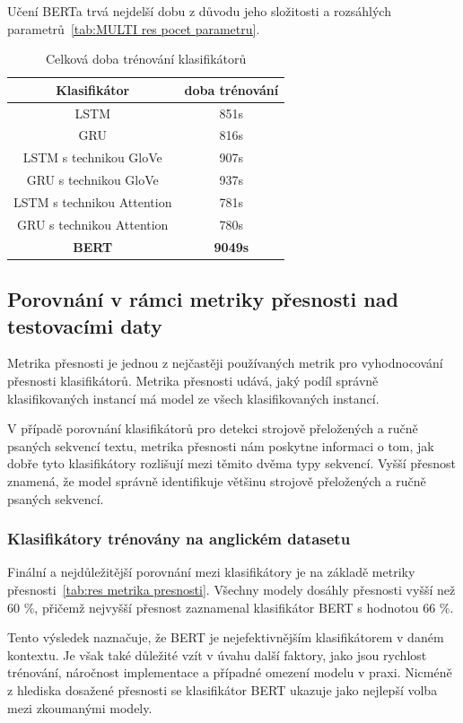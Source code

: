 Učení BERTa trvá nejdelší dobu z důvodu jeho složitosti a rozsáhlých parametrů~\ref{tab:MULTI res pocet parametru}.

\begin{table}[H]
	\centering
	\caption{Celková doba trénování klasifikátorů}\label{tab:MULTI res doba trenovani}
	\begin{tabular}{ c c }
			\toprule
			Klasifikátor & doba trénování\\
			\midrule
			LSTM & 851s\\
			GRU & 816s\\         
			LSTM s technikou GloVe & 907s\\         
			GRU s technikou GloVe  & 937s\\         
			LSTM s technikou Attention & 781s\\         
			GRU s technikou Attention & 780s\\         
			\textbf{BERT} & \textbf{9049s}\\         
			\midrule
		\end{tabular}
\end{table}


\subsection{Porovnání v rámci metriky přesnosti nad testovacími daty}
Metrika přesnosti je jednou z nejčastěji používaných metrik pro vyhodnocování přesnosti klasifikátorů.
Metrika přesnosti udává, jaký podíl správně klasifikovaných instancí má model ze všech klasifikovaných instancí.

V případě porovnání klasifikátorů pro detekci strojově přeložených a ručně psaných sekvencí textu, metrika přesnosti nám poskytne informaci o tom, jak dobře tyto klasifikátory rozlišují mezi těmito dvěma typy sekvencí.
Vyšší přesnost znamená, že model správně identifikuje většinu strojově přeložených a ručně psaných sekvencí.

\subsubsection{Klasifikátory trénovány na anglickém datasetu}
Finální a nejdůležitější porovnání mezi klasifikátory je na základě metriky přesnosti~\ref{tab:res metrika presnosti}.
Všechny modely dosáhly přesnosti vyšší než 60 \%, přičemž nejvyšší přesnost zaznamenal klasifikátor BERT s hodnotou 66 \%.

Tento výsledek naznačuje, že BERT je nejefektivnějším klasifikátorem v daném kontextu.
Je však také důležité vzít v úvahu další faktory, jako jsou rychlost trénování, náročnost implementace a případné omezení modelu v praxi.
Nicméně z hlediska dosažené přesnosti se klasifikátor BERT ukazuje jako nejlepší volba mezi zkoumanými modely.


